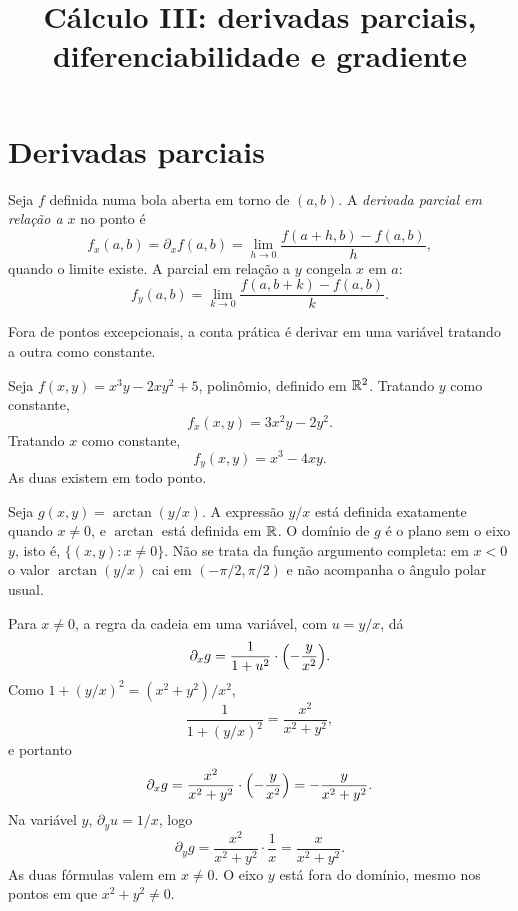 \documentclass[11pt,a4paper]{article}
\title{Cálculo III: derivadas parciais, diferenciabilidade e gradiente}
\author{}
\date{}
\begin{document}
\maketitle
\tableofcontents

\section{Derivadas parciais}


\begin{definicao}
Seja $f$ definida numa bola aberta em torno de $(a,b)$. A \emph{derivada parcial em relação a $x$} no ponto é
\[
f_x(a,b)=\partial_x f(a,b)=\lim_{h\to 0}\frac{f(a+h,b)-f(a,b)}{h},
\]
quando o limite existe. A parcial em relação a $y$ congela $x$ em $a$:
\[
f_y(a,b)=\lim_{k\to 0}\frac{f(a,b+k)-f(a,b)}{k}.
\]
\end{definicao}

Fora de pontos excepcionais, a conta prática é derivar em uma variável tratando a outra como constante.

\begin{exemplo}
Seja $f(x,y)=x^3 y-2xy^2+5$, polinômio, definido em $\mathbb{R}^2$. Tratando $y$ como constante,
\[
f_x(x,y)=3x^2 y-2y^2.
\]
Tratando $x$ como constante,
\[
f_y(x,y)=x^3-4xy.
\]
As duas existem em todo ponto.
\end{exemplo}

\begin{exemplo}
Seja $g(x,y)=\arctan(y/x)$. A expressão $y/x$ está definida exatamente quando $x\neq 0$, e $\arctan$ está definida em $\mathbb{R}$. O domínio de $g$ é o plano sem o eixo $y$, isto é, $\{(x,y):x\neq 0\}$. Não se trata da função argumento completa: em $x<0$ o valor $\arctan(y/x)$ cai em $(-\pi/2,\pi/2)$ e não acompanha o ângulo polar usual.

Para $x\neq 0$, a regra da cadeia em uma variável, com $u=y/x$, dá
\[
\partial_x g=\frac{1}{1+u^2}\cdot\Bigl(-\frac{y}{x^2}\Bigr).
\]
Como $1+(y/x)^2=(x^2+y^2)/x^2$,
\[
\frac{1}{1+(y/x)^2}=\frac{x^2}{x^2+y^2},
\]
e portanto
\[
\partial_x g=\frac{x^2}{x^2+y^2}\cdot\Bigl(-\frac{y}{x^2}\Bigr)=-\frac{y}{x^2+y^2}.
\]
Na variável $y$, $\partial_y u=1/x$, logo
\[
\partial_y g=\frac{x^2}{x^2+y^2}\cdot\frac{1}{x}=\frac{x}{x^2+y^2}.
\]
As duas fórmulas valem em $x\neq 0$. O eixo $y$ está fora do domínio, mesmo nos pontos em que $x^2+y^2\neq 0$.
\end{exemplo}
\end{document}
